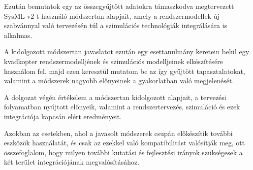 Ezután bemutatok egy az összegyűjtött adatokra támaszkodva megtervezett SysML v2-t használó módszertan alapjait, amely a rendszermodellek új szabvánnyal való tervezésén túl a szimulációs technológiák integrálására is alkalmas.

A kidolgozott módszertan javaslatot ezután egy esettanulmány keretein belül egy kvadkopter rendszermodelljének és szimulációs modelljeinek elkészítésére használom fel, majd ezen keresztül mutatom be az így gyűjtött tapasztalatokat, valamint a módszerek nagyobb előnyeinek a gyakorlatban való megjelenését.

A dolgozat végén értékelem a módszertan kidolgozott alapjait, a tervezési folyamatban nyújtott előnyeik, valamint a rendszertervezés, szimuláció és ezek integrációja kapcsán elért eredményeit.

Azokban az esetekben, ahol a javasolt módszerek csupán előkészítik további eszközök használatát, és csak az ezekkel való kompatibilitást valósítják meg, ott összefoglalom, hogy milyen további kutatási és fejlesztési irányok szükségesek a két terület integrációjának megvalósításához.